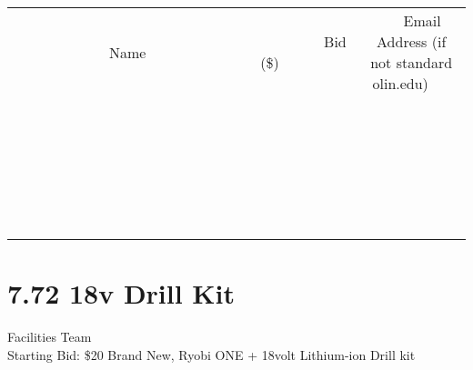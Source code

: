 \documentclass[11pt]{article}
\begin{document}
\begin{tabular}{c c c}
~~~~~~~~~~~~~Name~~~~~~~~~~~~~ & ~~~~~~~~~Bid (\$)~~~~~~~~~  & ~~~Email Address (if not standard olin.edu)~~~\\
 & & \\
\hline
 & & \\
\hline
 & & \\
\hline
 & & \\
\hline
 & & \\
\hline
 & & \\
\hline
 & & \\
\hline
 & & \\
\hline
 & & \\
\hline
 & & \\
\hline
 & & \\
\hline
 & & \\
\hline
 & & \\
\hline
 & & \\
\hline
 & & \\
\hline
 & & \\
\hline
 & & \\
\hline
 & & \\
\hline
 & & \\
\hline
 & & \\
\hline
 & & \\
\hline
 & & \\
\hline
 & & \\
\hline
 & & \\
\hline
 & & \\
\hline
 & & \\
\hline
\end{tabular}
\newpage
\section*{7.72 18v Drill Kit}
Facilities Team
\\
Starting Bid: \$20
\newline
Brand New, Ryobi ONE + 18volt Lithium-ion Drill kit
\end{document}
